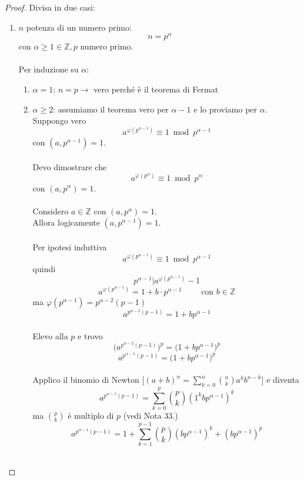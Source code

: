 \documentclass[a4paper,12pt, oneside]{book}
\begin{document}
\begin{teorema}
	\begin{proof}
		Divisa in due casi:
		\begin{enumerate}
			\item $n$ potenza di un numero primo: $$n=p^\alpha$$ con $\alpha \geq 1 \in \mathbb{Z}, p$ numero primo.\\\\
			      Per induzione su $\alpha$: \begin{enumerate}[label=\Roman*) ]
				      \item $\alpha = 1$: $n=p \rightarrow $ vero perché è il teorema di Fermat
				      \item $\alpha \geq 2$: assumiamo il teorema vero per $\alpha-1$ e lo proviamo per $\alpha$.\\
				            Suppongo vero
				            $$a^{\varphi(p^{\alpha-1})} \equiv 1 \bmod p^{\alpha-1}$$
				            con $(a, p^{\alpha-1}) = 1$.\\\\
				            Devo dimostrare che
				            $$a^{\varphi(p^{\alpha})} \equiv 1 \bmod p^{\alpha}$$
				            con $(a, p^{\alpha}) = 1$.\\\\
				            Considero $a \in \mathbb{Z}$ con $(a,p^\alpha) = 1$.\\
				            Allora logicamente $(a,p^{\alpha-1}) = 1$.\\\\
				            Per ipotesi induttiva
				            $$a^{\varphi(p^{\alpha-1})} \equiv 1 \bmod p^{\alpha-1}$$
				            quindi
				            $$p^{\alpha-1} | a^{\varphi(p^{\alpha-1})}-1$$
				            $$a^{\varphi(p^{\alpha-1})} = 1 + b \cdot p^{\alpha-1} \qquad \mbox{ con } b \in \mathbb{Z}$$
				            ma $\varphi(p^{\alpha-1}) = p^{\alpha-2}(p-1)$
				            $$a^{p^{\alpha-2} (p-1)} = 1+bp^{\alpha-1}$$\\
				            Elevo alla $p$ e trovo
				            $$\Big( a^{p^{\alpha-2} (p-1)} \Big)^p = \Big( 1+bp^{\alpha-1} \Big)^p$$
				            $$a^{p^{\alpha-1} (p-1)} = \Big( 1+bp^{\alpha-1} \Big)^p$$\\
				            Applico il binomio di Newton $\Big[ (a+b)^n = \sum_{k=0}^{n} \binom{n}{k} a^{k} b^{n-k} \Big]$ e diventa
				            $$a^{p^{\alpha-1} (p-1)} = \sum_{k=0}^{p} \binom{p}{k} (1^k b p^{\alpha-1})^k$$
				            ma $\binom{p}{k}$ è multiplo di $p$ (vedi Nota 33.)
				            $$a^{p^{\alpha-1} (p-1)} = 1 + \sum_{k=1}^{p-1} \binom{p}{k} (b p^{\alpha-1})^k + (bp^{\alpha-1})^p$$\\

\end{enumerate}
\end{enumerate}
\end{proof}
\end{teorema}
\end{document}
